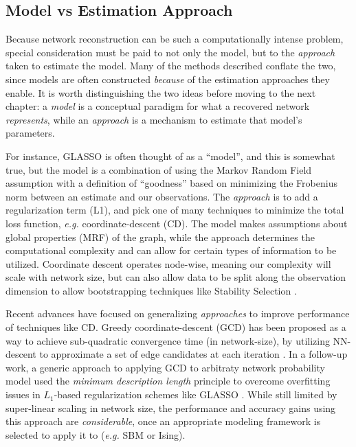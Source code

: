 \documentclass[%
	12pt,
		oneside,
		letterpaper
]{book}
\begin{document}
\subsection{Model vs Estimation Approach}\label{model-vs-estimation-approach}

Because network reconstruction can be such a computationally intense problem, special consideration must be paid to not only the model, but to the \emph{approach} taken to estimate the model.
Many of the methods described conflate the two, since models are often constructed \emph{because} of the estimation approaches they enable.
It is worth distinguishing the two ideas before moving to the next chapter: a \emph{model} is a conceptual paradigm for what a recovered network \emph{represents}, while an \emph{approach} is a mechanism to estimate that model's parameters.

For instance, GLASSO is often thought of as a ``model'', and this is somewhat true, but the model is a combination of using the Markov Random Field assumption with a definition of ``goodness'' based on minimizing the Frobenius norm between an estimate and our observations.
The \emph{approach} is to add a regularization term (L1), and pick one of many techniques to minimize the total loss function, \emph{e.g.} coordinate-descent (CD).
The model makes assumptions about global properties (MRF) of the graph, while the approach determines the computational complexity and can allow for certain types of information to be utilized.
Coordinate descent operates node-wise, meaning our complexity will scale with network size, but can also allow data to be split along the observation dimension to allow bootstrapping techniques like Stability Selection \autocite{StabilitySelection_Meinshausen2010}.

Recent advances have focused on generalizing \emph{approaches} to improve performance of techniques like CD.
Greedy coordinate-descent (GCD) has been proposed as a way to achieve sub-quadratic convergence time (in network-size), by utilizing NN-descent to approximate a set of edge candidates at each iteration \autocite{Scalablenetworkreconstruction_Peixoto2024}.
In a follow-up work, a generic approach to applying GCD to arbitraty network probability model used the \emph{minimum description length} principle to overcome overfitting issues in \(L_1\)-based regularization schemes like GLASSO \autocite{Networkreconstructionvia_Peixoto2024}.
While still limited by super-linear scaling in network size, the performance and accuracy gains using this approach are \emph{considerable}, once an appropriate modeling framework is selected to apply it to (\emph{e.g.} SBM or Ising).
\end{document}
